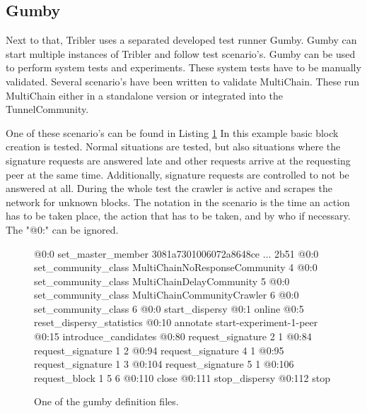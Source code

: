 \subsection{Gumby}

Next to that, Tribler uses a separated developed test runner Gumby.
Gumby can start multiple instances of Tribler and follow test scenario's.
Gumby can be used to perform system tests and experiments.
These system tests have to be manually validated.
Several scenario's have been written to validate MultiChain.
These run MultiChain either in a standalone version or integrated into the TunnelCommunity.

One of these scenario's can be found in Listing \ref{fig:exp-gumby-scenario}
In this example basic block creation is tested.
Normal situations are tested,
but also situations where the signature requests are answered late
and other requests arrive at the requesting peer at the same time.
Additionally, signature requests are controlled to not be answered at all.
During the whole test the crawler is active and scrapes the network for unknown blocks.
The notation in the scenario is the time an action has to be taken place,
the action that has to be taken, and by who if necessary.
The "@0:" can be ignored.

\begin{figure}
\begin{FVerbatim}[fontsize=\small]
@0:0 set_master_member 3081a7301006072a8648ce ... 2b51
@0:0 set_community_class MultiChainNoResponseCommunity {4}
@0:0 set_community_class MultiChainDelayCommunity {5}
@0:0 set_community_class MultiChainCommunityCrawler {6}
@0:0 set_community_class {6}
@0:0 start_dispersy
@0:1 online
@0:5 reset_dispersy_statistics
@0:10 annotate start-experiment-1-peer
@0:15 introduce_candidates
@0:80 request_signature 2 {1}
@0:84 request_signature 1 {2}
@0:94 request_signature 4 {1}
@0:95 request_signature 1 {3}
@0:104 request_signature 5 {1}
@0:106 request_block 1 5 {6}
@0:110 close
@0:111 stop_dispersy
@0:112 stop
\end{FVerbatim}
    \caption{One of the gumby definition files.}
    \label{fig:exp-gumby-scenario}
\end{figure}